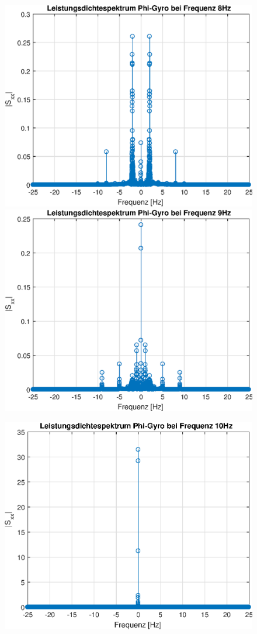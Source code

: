 \documentclass{article}
\begin{document}
\begin{figure}[h!]
\includegraphics[width=0.5\linewidth]{img/lds_phi_g_9}
\includegraphics[width=0.5\linewidth]{img/lds_phi_g_10}
\end{figure}
\begin{figure}[h!]
\centering
\includegraphics[width=0.5\linewidth]{img/lds_phi_g_11}
\end{figure}
\end{document}
